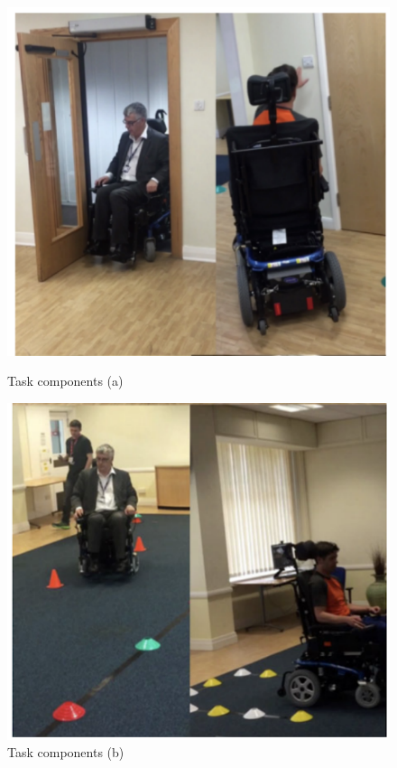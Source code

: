 \begin{figure}[!htbp]
\center
\begin{minipage}{0.5\linewidth}
\center
\captionsetup{justification=centering,margin=0.5cm,font=small}
\includegraphics[width=0.93\linewidth]{img/cap3/john2018task-a}
\caption{Task components (a) \cite{john2018}} \label{fig:john2018task-a}
\end{minipage}
\begin{minipage}{0.492\linewidth}
\center
\captionsetup{justification=centering,margin=0cm,font=small}
\includegraphics[width=0.95\linewidth]{img/cap3/john2018task-b}
\caption{Task components (b) \cite{john2018}} \label{fig:john2018task-b}
\end{minipage}
\end{figure}

